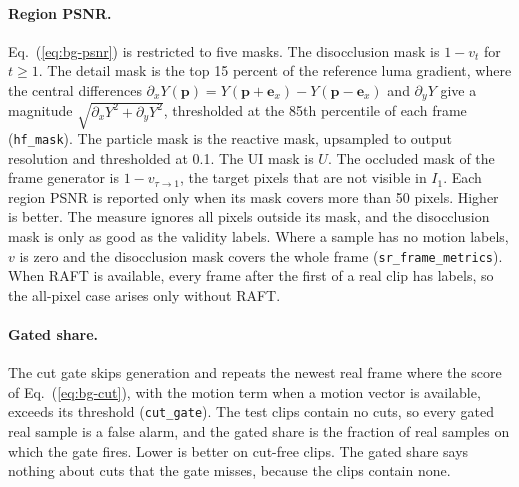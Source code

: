 \paragraph{Region PSNR.} Eq.~(\ref{eq:bg-psnr}) is restricted to five masks. The disocclusion mask is $1-v_t$ for $t\ge1$. The detail mask is the top 15 percent of the reference luma gradient, where the central differences $\partial_xY(\mathbf p)=Y(\mathbf p+\mathbf e_x)-Y(\mathbf p-\mathbf e_x)$ and $\partial_yY$ give a magnitude $\sqrt{\partial_x Y^2+\partial_y Y^2}$, thresholded at the 85th percentile of each frame (\texttt{hf\_mask}). The particle mask is the reactive mask, upsampled to output resolution and thresholded at 0.1. The UI mask is $U$. The occluded mask of the frame generator is $1-v_{\tau\to1}$, the target pixels that are not visible in $I_1$. Each region PSNR is reported only when its mask covers more than 50 pixels. Higher is better. The measure ignores all pixels outside its mask, and the disocclusion mask is only as good as the validity labels. Where a sample has no motion labels, $v$ is zero and the disocclusion mask covers the whole frame (\texttt{sr\_frame\_metrics}). When RAFT is available, every frame after the first of a real clip has labels, so the all-pixel case arises only without RAFT.

\paragraph{Gated share.} The cut gate skips generation and repeats the newest real frame where the score of Eq.~(\ref{eq:bg-cut}), with the motion term when a motion vector is available, exceeds its threshold (\texttt{cut\_gate}). The test clips contain no cuts, so every gated real sample is a false alarm, and the gated share is the fraction of real samples on which the gate fires. Lower is better on cut-free clips. The gated share says nothing about cuts that the gate misses, because the clips contain none.
